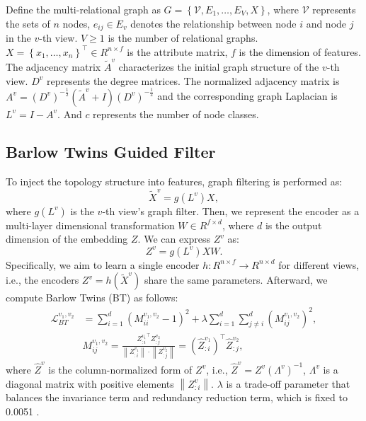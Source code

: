 \documentclass[letterpaper]{article} %
\begin{document}
Define the multi-relational graph as $G=\left\{\mathcal{V}, E_1, \ldots, E_{V}, X\right\}$, where $\mathcal{V}$ represents the sets of $n$ nodes, $e_{i j} \in E_v$ denotes the relationship between node $i$ and node $j$ in the $v$-th view. ${V} \geq 1$ is the number of relational graphs. $X=\left\{x_1, \ldots, x_n\right\}^{\top} \in {R}^{n \times f}$ is the attribute matrix, $f$ is the dimension of features. The adjacency matrix $\widetilde{A}^v$ characterizes the initial graph structure of the $v$-th view. $D^v$ represents the degree matrices. The normalized adjacency matrix is $A^v=\left(D^v\right)^{-\frac{1}{2}}\left(\widetilde{A}^v+I\right)\left(D^v\right)^{-\frac{1}{2}}$ and the corresponding graph Laplacian is $L^v=I-A^v$. And $c$ represents the number of node classes.


\subsection{Barlow Twins Guided Filter}

To inject the topology structure into features, graph filtering is performed as:
\begin{equation}
    \widetilde{X}^{v} = g(L^{v}) X,
\end{equation}
where $g(L^v)$ is the $v$-th view's graph filter.
Then, we represent the encoder as a multi-layer dimensional transformation $W \in R^{f\times d}$, where $d$ is the output dimension of the embedding $Z$. We can express $Z^{v}$ as:
\begin{equation}\label{embedding}
    Z^{v} = g(L^{v}) X W.
\end{equation}
Specifically, we aim to learn a single encoder $h: R^{n\times f} \to R^{n\times d}$ for different views, i.e., the encoders $Z^v = h(\widetilde{X}^v)$  share the same parameters.
Afterward, we compute Barlow Twins (BT) as follows:
\begin{equation}
\begin{aligned}\label{barlowtwins1}
    \mathcal{L}^{v_1,v_2}_{BT} &=\sum_{i=1}^{d}\left(M^{v_1,v_2}_{i i}-1\right)^{2}+\lambda \sum_{i=1}^{d} \sum_{j \neq i}^d (M^{v_1,v_2}_{i j})^{2}, \\
    &M^{v_1,v_2}_{i j} = \frac{{Z^{v_1}_{:i}}^{\top} Z^{v_2}_{:j}}{\left\|Z^{v_1}_{:i}\right\| \cdot\left\|Z^{v_2}_{:j}\right\|} = (\hat{Z}^{v_1}_{:i})^{\top} \hat{Z}^{v_2}_{:j},
\end{aligned}
\end{equation}
where  $\hat{Z}^{v}$ is the column-normalized form of $Z^{v}$, i.e., $\hat{Z}^{v} = Z^{v}(\Lambda^{v})^{-1}$, $\Lambda^{v}$ is a diagonal matrix with positive elements $\left\|Z^{v}_{:i}\right\|$. $\lambda$ is a trade-off parameter that balances the invariance term and redundancy reduction term, which is fixed to 0.0051 \cite{zbontar2021barlow}.
\end{document}
